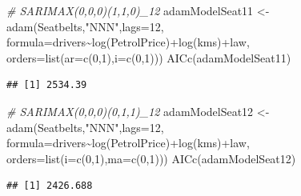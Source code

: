 \documentclass[
]{book}
\newenvironment{Shaded}{\begin{snugshade}}{\end{snugshade}}
\newcommand{\AttributeTok}[1]{\textcolor[rgb]{0.77,0.63,0.00}{#1}}
\newcommand{\CommentTok}[1]{\textcolor[rgb]{0.56,0.35,0.01}{\textit{#1}}}
\newcommand{\DecValTok}[1]{\textcolor[rgb]{0.00,0.00,0.81}{#1}}
\newcommand{\FunctionTok}[1]{\textcolor[rgb]{0.00,0.00,0.00}{#1}}
\newcommand{\NormalTok}[1]{#1}
\newcommand{\OtherTok}[1]{\textcolor[rgb]{0.56,0.35,0.01}{#1}}
\newcommand{\SpecialCharTok}[1]{\textcolor[rgb]{0.00,0.00,0.00}{#1}}
\newcommand{\StringTok}[1]{\textcolor[rgb]{0.31,0.60,0.02}{#1}}
\theoremstyle{definition}
\theoremstyle{definition}
\theoremstyle{definition}
\theoremstyle{definition}
\theoremstyle{remark}
\begin{document}
\begin{Shaded}
\begin{Highlighting}[]
\CommentTok{\# SARIMAX(0,0,0)(1,1,0)\_12}
\NormalTok{adamModelSeat11 }\OtherTok{\textless{}{-}} \FunctionTok{adam}\NormalTok{(Seatbelts,}\StringTok{"NNN"}\NormalTok{,}\AttributeTok{lags=}\DecValTok{12}\NormalTok{,}
                        \AttributeTok{formula=}\NormalTok{drivers}\SpecialCharTok{\textasciitilde{}}\FunctionTok{log}\NormalTok{(PetrolPrice)}\SpecialCharTok{+}\FunctionTok{log}\NormalTok{(kms)}\SpecialCharTok{+}\NormalTok{law,}
                        \AttributeTok{orders=}\FunctionTok{list}\NormalTok{(}\AttributeTok{ar=}\FunctionTok{c}\NormalTok{(}\DecValTok{0}\NormalTok{,}\DecValTok{1}\NormalTok{),}\AttributeTok{i=}\FunctionTok{c}\NormalTok{(}\DecValTok{0}\NormalTok{,}\DecValTok{1}\NormalTok{)))}
\FunctionTok{AICc}\NormalTok{(adamModelSeat11)}
\end{Highlighting}
\end{Shaded}

\begin{verbatim}
## [1] 2534.39
\end{verbatim}

\begin{Shaded}
\begin{Highlighting}[]
\CommentTok{\# SARIMAX(0,0,0)(0,1,1)\_12}
\NormalTok{adamModelSeat12 }\OtherTok{\textless{}{-}} \FunctionTok{adam}\NormalTok{(Seatbelts,}\StringTok{"NNN"}\NormalTok{,}\AttributeTok{lags=}\DecValTok{12}\NormalTok{,}
                        \AttributeTok{formula=}\NormalTok{drivers}\SpecialCharTok{\textasciitilde{}}\FunctionTok{log}\NormalTok{(PetrolPrice)}\SpecialCharTok{+}\FunctionTok{log}\NormalTok{(kms)}\SpecialCharTok{+}\NormalTok{law,}
                        \AttributeTok{orders=}\FunctionTok{list}\NormalTok{(}\AttributeTok{i=}\FunctionTok{c}\NormalTok{(}\DecValTok{0}\NormalTok{,}\DecValTok{1}\NormalTok{),}\AttributeTok{ma=}\FunctionTok{c}\NormalTok{(}\DecValTok{0}\NormalTok{,}\DecValTok{1}\NormalTok{)))}
\FunctionTok{AICc}\NormalTok{(adamModelSeat12)}
\end{Highlighting}
\end{Shaded}

\begin{verbatim}
## [1] 2426.688
\end{verbatim}
\end{document}
